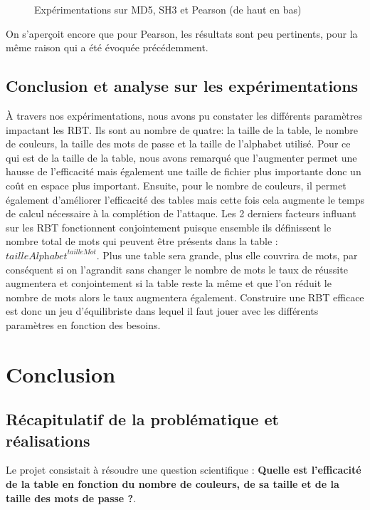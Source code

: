 \documentclass[french,12pt]{article}
\begin{document}
\begin{figure}[H]
    \hspace{0mm}
    
    
    \caption{Expérimentations sur MD5, SH3 et Pearson (de haut en bas)}
    \end{figure}

    On s'aperçoit encore que pour Pearson, les résultats sont peu pertinents, pour la même raison qui a été évoquée précédemment.

   \subsection{Conclusion et analyse sur les expérimentations}
À travers nos expérimentations, nous avons pu constater les différents paramètres impactant les RBT. Ils sont au nombre de quatre: la taille de la table, le nombre de couleurs, la taille des mots de passe et la taille de l'alphabet utilisé. Pour ce qui est de la taille de la table, nous avons remarqué que l'augmenter permet une hausse de l'efficacité mais également une taille de fichier plus importante donc un coût en espace plus important. Ensuite, pour le nombre de couleurs, il permet également d'améliorer l'efficacité des tables mais cette fois cela augmente le temps de calcul nécessaire à la complétion de l'attaque. Les 2 derniers facteurs influant sur les RBT fonctionnent conjointement puisque ensemble ils définissent le nombre total de mots qui peuvent être présents dans la table : $\textit{tailleAlphabet}^\textit{tailleMot}$. Plus une table sera grande, plus elle couvrira de mots, par conséquent si on l'agrandit sans changer le nombre de mots le taux de réussite augmentera et conjointement si la table reste la même et que l'on réduit le nombre de mots alors le taux augmentera également. Construire une RBT efficace est donc un jeu d'équilibriste dans lequel il faut jouer avec les différents paramètres en fonction des besoins.
        

    \section{Conclusion}

\subsection{Récapitulatif de la problématique et réalisations}
Le projet consistait à résoudre une question scientifique : \textbf{Quelle est l'efficacité de la table en fonction du nombre de couleurs, de sa taille et de la taille des mots de passe ?}. 
\end{document}
